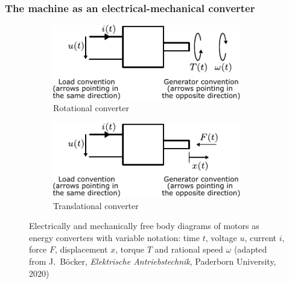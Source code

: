 \begin{frame}
	\frametitle{The machine as an electrical-mechanical converter}
	\begin{figure}
		\centering
		\begin{subfigure}[b]{0.49\textwidth}
			\centering
			\includegraphics[width=0.9\textwidth]{fig/lec01/Block_diagram_rotational_converter.pdf}
			\caption{Rotational converter}
		\end{subfigure}
		\hfill
		\begin{subfigure}[b]{0.49\textwidth}
			\centering
			\includegraphics[width=0.9\textwidth]{fig/lec01/Block_diagram_translational_converter.pdf}
			\caption{Translational converter}
		\end{subfigure}
		\caption{Electrically and mechanically free body diagrams of motors as energy converters  with variable notation: time $t$, voltage $u$, current $i$, force $F$, displacement $x$, torque $T$ and rational speed $\omega$ (adapted from J.~B\"ocker, \textit{Elektrische Antriebstechnik}, Paderborn University, 2020)} 
        \label{fig:free_body_diagrams_motor}
	\end{figure}
\end{frame}

